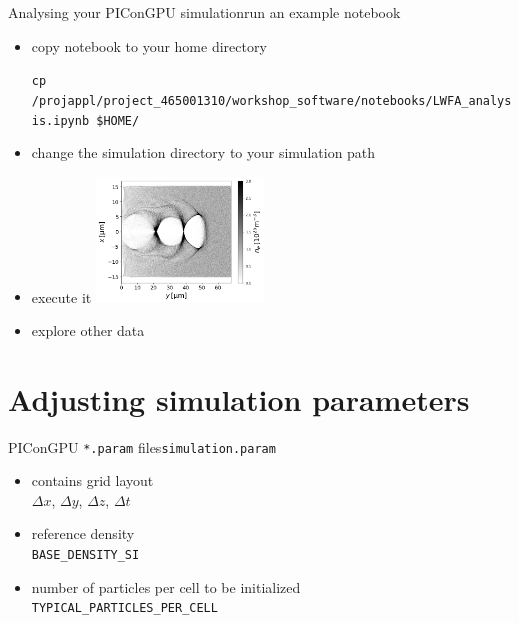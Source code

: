 \documentclass[
  aspectratio=169,
  10pt
]{beamer}
\newcommand{\terminal}[1]{\par\noindent\colorbox{shadecolor}
{\parbox{\dimexpr\textwidth-2\fboxsep\relax}{\texttt{#1}}}}
\begin{document}
\begin{frame}[t,fragile]{Analysing your PIConGPU simulation}{run an example notebook}

\begin{itemize}
    \item copy notebook to your home directory
    \terminal{cp /projappl/project\_465001310/workshop\_software/notebooks/LWFA\_analysis.ipynb \$HOME/}
    \item change the simulation directory to your simulation path
    \item execute it
    \includegraphics[width=0.35\textwidth]{images/LWFA_density.png}
    \item explore other data

\end{itemize}

\end{frame}


\part{Adjusting simulation parameters}
\frame{\partpage}


\begin{frame}[t,fragile]{PIConGPU \texttt{*.param} files}{\texttt{simulation.param}}

\begin{itemize}
    \item contains grid layout\\
    $\Delta x$, $\Delta y$, $\Delta z$, $\Delta t$
    \item reference density \\
    \texttt{BASE\_DENSITY\_SI}
    \item number of particles per cell to be initialized \\
    \texttt{TYPICAL\_PARTICLES\_PER\_CELL}

\end{itemize}

\end{frame}
\end{document}
